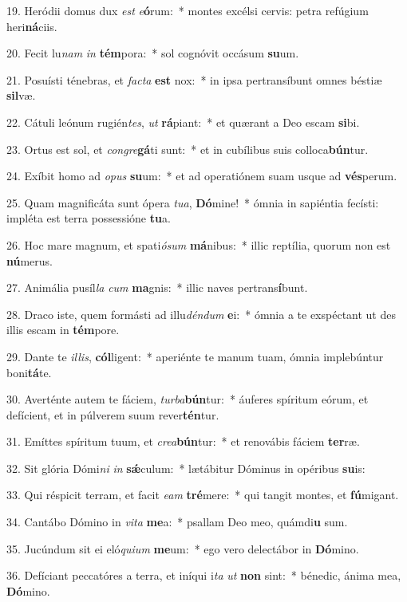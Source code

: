 19. Heródii domus dux \textit{est} \textit{e}\textbf{ó}rum:~*  montes excélsi cervis: petra refúgium heri\textbf{ná}ciis.\

20. Fecit lu\textit{nam} \textit{in} \textbf{tém}pora:~*  sol cognóvit occásum \textbf{su}um.\

21. Posuísti ténebras, et \textit{fac}\textit{ta} \textbf{est} nox:~*  in ipsa pertransíbunt omnes béstiæ \textbf{sil}væ.\

22. Cátuli leónum rugién\textit{tes}, \textit{ut} \textbf{rá}piant:~*  et quærant a Deo escam \textbf{si}bi.\

23. Ortus est sol, et \textit{con}\textit{gre}\textbf{gá}ti sunt:~*  et in cubílibus suis colloca\textbf{bún}tur.\

24. Exíbit homo ad \textit{o}\textit{pus} \textbf{su}um:~*  et ad operatiónem suam usque ad \textbf{vés}perum.\

25. Quam magnificáta sunt ópera \textit{tu}\textit{a}, \textbf{Dó}mine!~*  ómnia in sapiéntia fecísti: impléta est terra possessióne \textbf{tu}a.\

26. Hoc mare magnum, et spati\textit{ó}\textit{sum} \textbf{má}nibus:~*  illic reptília, quorum non est \textbf{nú}merus.\

27. Animália pusíl\textit{la} \textit{cum} \textbf{ma}gnis:~*  illic naves pertrans\textbf{í}bunt.\

28. Draco iste, quem formásti ad illu\textit{dén}\textit{dum} \textbf{e}i:~*  ómnia a te exspéctant ut des illis escam in \textbf{tém}pore.\

29. Dante te \textit{il}\textit{lis}, \textbf{cól}ligent:~*  aperiénte te manum tuam, ómnia implebúntur boni\textbf{tá}te.\

30. Averténte autem te fáciem, \textit{tur}\textit{ba}\textbf{bún}tur:~*  áuferes spíritum eórum, et defícient, et in púlverem suum rever\textbf{tén}tur.\

31. Emíttes spíritum tuum, et \textit{cre}\textit{a}\textbf{bún}tur:~*  et renovábis fáciem \textbf{ter}ræ.\

32. Sit glória Dómi\textit{ni} \textit{in} \textbf{sǽ}culum:~*  lætábitur Dóminus in opéribus \textbf{su}is:\

33. Qui réspicit terram, et facit \textit{e}\textit{am} \textbf{tré}mere:~*  qui tangit montes, et \textbf{fú}migant.\

34. Cantábo Dómino in \textit{vi}\textit{ta} \textbf{me}a:~*  psallam Deo meo, quámdi\textbf{u} sum.\

35. Jucúndum sit ei eló\textit{qui}\textit{um} \textbf{me}um:~*  ego vero delectábor in \textbf{Dó}mino.\

36. Defíciant peccatóres a terra, et iníqui i\textit{ta} \textit{ut} \textbf{non} sint:~*  bénedic, ánima mea, \textbf{Dó}mino.\

